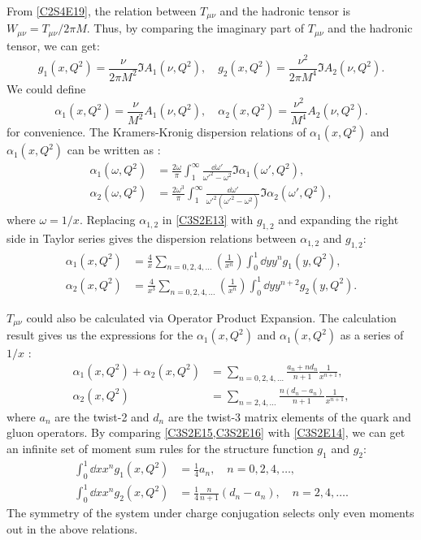 From \cref{C2S4E19}, the relation between $T_{\mu\nu}$ and the hadronic tensor is $W_{\mu\nu}=T_{\mu\nu}/2\pi M$. Thus, by comparing the imaginary part of $T_{\mu\nu}$ and the hadronic tensor, we can get:
\begin{equation} \label{C3S2E11}
g_1(x,Q^2) = \frac{\nu}{2\pi M^2}\Im A_1(\nu,Q^2), \quad g_2(x,Q^2) = \frac{\nu^2}{2\pi M^4}\Im A_2(\nu,Q^2).
\end{equation}
We could define
\begin{equation} \label{C3S2E12}
\alpha_1(x,Q^2) = \frac{\nu}{M^2}A_1(\nu,Q^2), \quad \alpha_2(x,Q^2) = \frac{\nu^2}{M^4}A_2(\nu,Q^2).
\end{equation}
for convenience.
The Kramers-Kronig dispersion relations of $\alpha_1(x,Q^2)$ and $\alpha_1(x,Q^2)$ can be written as \cite{Jaffe1990}:
\begin{equation} \label{C3S2E13}
\begin{split}
\alpha_1(\omega,Q^2) & = \frac{2\omega}{\pi}\int_1^\infty\frac{\dd{\omega'}}{\omega'^2-\omega^2}\Im\alpha_1(\omega',Q^2), \\
\alpha_2(\omega,Q^2) & = \frac{2\omega^3}{\pi}\int_1^\infty\frac{\dd{\omega'}}{\omega'^2(\omega'^2-\omega^2)}\Im\alpha_2(\omega',Q^2),
\end{split}
\end{equation}
where $\omega=1/x$. Replacing $\alpha_{1,2}$ in \cref{C3S2E13} with $g_{1,2}$ and expanding the right side in Taylor series gives the dispersion relations between $\alpha_{1,2}$ and $g_{1,2}$:
\begin{equation} \label{C3S2E14}
\begin{split}
\alpha_1(x,Q^2) & = \frac{4}{x}\sum_{n=0,2,4,\dots}\left(\frac{1}{x^{n}}\right)\int_0^1\dd{y}y^ng_1(y,Q^2), \\
\alpha_2(x,Q^2) & = \frac{4}{x^3}\sum_{n=0,2,4,\dots}\left(\frac{1}{x^{n}}\right)\int_0^1\dd{y}y^{n+2}g_2(y,Q^2).
\end{split}
\end{equation}

$T_{\mu\nu}$ could also be calculated via Operator Product Expansion. The calculation result gives us the expressions for the $\alpha_1(x,Q^2)$ and $\alpha_1(x,Q^2)$ as a series of $1/x$ \cite{Jaffe1990}:
\begin{align} \label{C3S2E15}
\alpha_1(x,Q^2)+\alpha_2(x,Q^2) & = \sum_{n=0,2,4,\dots}\frac{a_n+nd_n}{n+1}\frac{1}{x^{n+1}}, \\ \label{C3S2E16}
\alpha_2(x,Q^2) & = \sum_{n=2,4,\dots}\frac{n(d_n-a_n)}{n+1}\frac{1}{x^{n+1}},
\end{align}
where $a_n$ are the twist-2 and $d_n$ are the twist-3 matrix elements of the quark and gluon operators. By comparing \cref{C3S2E15,C3S2E16} with \cref{C3S2E14}, we can get an infinite set of moment sum rules for the structure function $g_1$ and $g_2$:
\begin{align} \label{C3S2E17}
\int_0^1\dd{x}x^ng_1(x,Q^2) & = \frac{1}{4}a_n, \quad n = 0,2,4,\dots, \\ \label{C3S2E18}
\int_0^1\dd{x}x^ng_2(x,Q^2) & = \frac{1}{4}\frac{n}{n+1}(d_n-a_n), \quad n = 2,4,\dots.
\end{align}
The symmetry of the system under charge conjugation selects only even moments out in the above relations.

